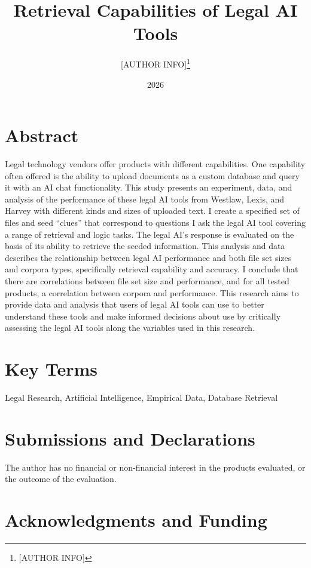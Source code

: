 \documentclass[
]{article}
\title{Retrieval Capabilities of Legal AI Tools}
\author{{[}AUTHOR INFO{]}\footnote{{[}AUTHOR INFO{]}}}
\date{2026}
\begin{document}
\setcounter{page}{1}

{
\setcounter{tocdepth}{3}
\tableofcontents

\clearpage
{}
\setcounter{page}{1}


}
\section{Abstract}\label{abstract}

Legal technology vendors offer products with different capabilities. One capability often offered is the ability to upload documents as a custom database and query it with an AI chat functionality. This study presents an experiment, data, and analysis of the performance of these legal AI tools from Westlaw, Lexis, and Harvey with different kinds and sizes of uploaded text. I create a specified set of files and seed ``clues'' that correspond to questions I ask the legal AI tool covering a range of retrieval and logic tasks. The legal AI's response is evaluated on the basis of its ability to retrieve the seeded information. This analysis and data describes the relationship between legal AI performance and both file set sizes and corpora types, specifically retrieval capability and accuracy. I conclude that there are correlations between file set size and performance, and for all tested products, a correlation between corpora and performance. This research aims to provide data and analysis that users of legal AI tools can use to better understand these tools and make informed decisions about use by critically assessing the legal AI tools along the variables used in this research.

\section{Key Terms}\label{key-terms}

Legal Research, Artificial Intelligence, Empirical Data, Database Retrieval

\section{Submissions and Declarations}\label{submissions-and-declarations}

The author has no financial or non-financial interest in the products evaluated, or the outcome of the evaluation.

\section{Acknowledgments and Funding}\label{acknowledgments-and-funding}
\end{document}
